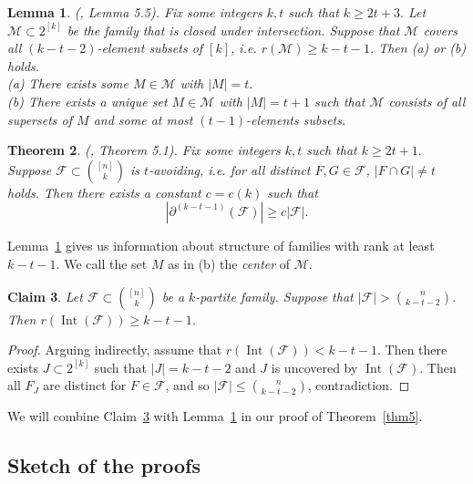\documentclass[12pt,a4paper]{article}
\newcommand{\ff}{\mathcal{F}}
\newtheorem{Theorem}{Theorem}
\newtheorem{Claim}[Theorem]{Claim}
\newtheorem{Lemma}[Theorem]{Lemma}
\begin{document}
\begin{Lemma} \label{lem9}
(\cite{FF}, Lemma 5.5).
Fix some integers $k,t$ such that $k \geqslant 2t+3.$  Let $\mathcal{M} \subset 2^{[k]}$ be the family that is closed under intersection. Suppose that $\mathcal{M}$ covers all $(k-t-2)$-element subsets of $[k]$, i.e. $r(\mathcal{M}) \geqslant k-t-1$. Then (a) or (b) holds.\\
(a) There exists some $M \in \mathcal{M}$ with $|M|=t.$\\
(b) There exists a unique set $M \in \mathcal{M}$ with $|M|=t+1$ such that $\mathcal{M}$ consists of all supersets of $M$ and some at most $(t-1)$-elements subsets.
\end{Lemma}

\begin{Theorem} \label{thm10}
(\cite{FF}, Theorem 5.1).
Fix some integers $k,t$ such that $k \geqslant 2t+1.$ Suppose $\mathcal{F} \subset \binom{[n]}{k}$ is $t$-avoiding, i.e. for all distinct $F, G \in \mathcal{F}$, $|F \cap G| \neq t$ holds. Then there exists a constant $c=c(k)$ such that
$$|\partial^{(k-t-1)}(\mathcal{F})| \geqslant c|\mathcal{F}|.$$
\end{Theorem}

Lemma~\ref{lem9} gives us information about structure of families with rank at least $k-t-1$. We call the set $M$ as in (b) the \textit{center} of $\mathcal{M}$.

\begin{Claim}\label{cla11}
    Let $\ff \subset \binom{[n]}{k}$ be a $k$-partite family. Suppose that $|\ff| > \binom{n}{k-t-2}$. Then $r(\operatorname{Int}(\ff)) \geqslant k-t-1$.
\end{Claim}

\begin{proof}
    Arguing indirectly, assume that $r(\operatorname{Int}(\ff)) < k-t-1$. Then there exists $J \subset 2^{[k]}$ such that $|J|=k-t-2$ and $J$ is uncovered by $\operatorname{Int}(\ff)$. Then all $F_J$ are distinct for $F \in \ff$, and so $|\mathcal{F}| \leqslant \binom{n}{k-t-2}$, contradiction.    
\end{proof}

We will combine Claim~\ref{cla11} with Lemma~\ref{lem9} in our proof of Theorem~\ref{thm5}.

\subsection{Sketch of the proofs}

\end{document}
